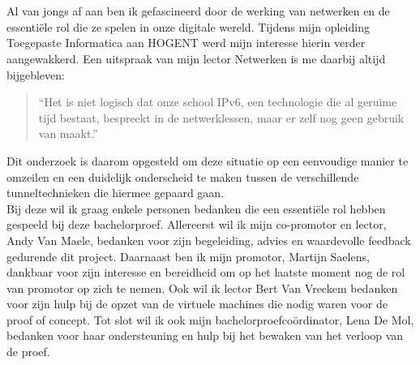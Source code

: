
\chapter*{}%
\label{ch:voorwoord}


Al van jongs af aan ben ik gefascineerd door de werking van netwerken en de essentiële rol die ze spelen in onze digitale wereld.  
Tijdens mijn opleiding Toegepaste Informatica aan HOGENT werd mijn interesse hierin verder aangewakkerd.  
Een uitspraak van mijn lector Netwerken is me daarbij altijd bijgebleven:  

\begin{quote}
    ``Het is niet logisch dat onze school IPv6, een technologie die al geruime tijd bestaat, bespreekt in de netwerklessen, maar er zelf nog geen gebruik van maakt.''
\end{quote}

Dit onderzoek is daarom opgesteld om deze situatie op een eenvoudige manier te omzeilen en een duidelijk onderscheid te maken tussen de verschillende tunneltechnieken die hiermee gepaard gaan.\\

Bij deze wil ik graag enkele personen bedanken die een essentiële rol hebben gespeeld bij deze bachelorproef.  
Allereerst wil ik mijn co-promotor en lector, Andy Van Maele, bedanken voor zijn begeleiding, advies en waardevolle feedback gedurende dit project.  
Daarnaast ben ik mijn promotor, Martijn Saelens, dankbaar voor zijn interesse en bereidheid om op het laatste moment nog de rol van promotor op zich te nemen.
Ook wil ik lector Bert Van Vreckem bedanken voor zijn hulp bij de opzet van de virtuele machines die nodig waren voor de proof of concept.
Tot slot wil ik ook mijn bachelorproefcoördinator, Lena De Mol, bedanken voor haar ondersteuning en hulp bij het bewaken van het verloop van de proef.  

